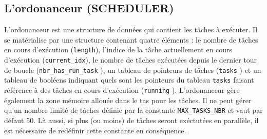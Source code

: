 \subsection{L'ordonanceur (SCHEDULER)}
\label{subsec:scheduler}
L'ordonanceur est une structure de données qui contient les tâches à exécuter. Il se
matérialise par une structure contenant quatre éléments : le nombre de tâches en cours
d'exécution (\texttt{length}), l'indice de la tâche
actuellement en cours d'exécution (\texttt{current\_idx}),
le nombre de tâches exécutées depuis le dernier tour de boucle (\texttt{nbr\_has\_run\_task}
), un tableau de pointeurs de tâches (\texttt{tasks}
) et un tableau de booléens indiquant quels sont les pointeurs
du tableau \texttt{tasks} faisant référence à des tâches en cours d'exécution (\texttt{running}
). L'ordonanceur gère également la zone mémoire allouée dans
le tas pour les tâches. Il ne peut gérer qu'un nombre limité de tâches définie par la constante
\texttt{MAX\_TASKS\_NBR} et vaut par défaut 50. Là aussi, si
plus (ou moins) de tâches seront exéctutées en parallèle, il est nécessaire de redéfinir cette
constante en conséquence.

